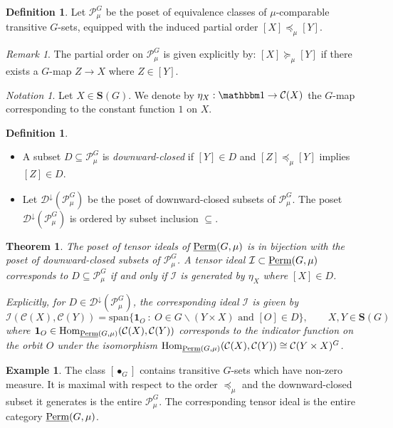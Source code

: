 \documentclass[11pt,a4paper]{amsart}
\theoremstyle{plain}%
\newtheorem{theorem}[lemma]{Theorem}
\theoremstyle{definition}
\newtheorem{definition}[lemma]{Definition}
\newtheorem{example}[lemma]{Example}
\theoremstyle{remark}
\newtheorem{remark}[lemma]{Remark}
\newtheorem{notation}[lemma]{Notation}
\newcommand{\Hom}{\operatorname{Hom}}
\newcommand{\triv}{{\mathbbm 1}}
\newcommand{\Span}{\mathrm{span}}
\newcommand{\Perm}{\underline{{\rm Perm}}}
\newcommand{\one}{{\mathbf{1}}}
\newcommand{\Down}{\mathcal{D}^{\downarrow}}
\newcommand{\cC}{\mathcal{C}}
\newcommand{\Set}[1]{\mathbf{S}(#1)}
\begin{document}
\begin{definition}
Let $\mathcal{P}^G_\mu$ be the poset of equivalence classes of $\mu$-comparable transitive $G$-sets, equipped with the induced partial order $[X] \preceq_\mu [Y]$. 

\end{definition}
\begin{remark}
    The partial order on $\mathcal{P}^G_\mu$ is given explicitly by: $[X] \succeq_\mu [Y]$ if there exists a $G$-map $Z\rightarrow X$ where $Z\in [Y]$.
\end{remark}

\begin{notation}
    Let $X\in \mathbf{S}(G)$. We denote by $\eta_X:\triv \to \mathcal{C}(X)$ the $G$-map corresponding to the constant function $1$ on $X$. 
\end{notation}




\begin{definition} 

\mbox{}

\begin{itemize}[itemindent=0pt,leftmargin=*]
    \item A subset $D \subseteq \mathcal{P}^G_\mu$ is \emph{downward-closed} if $[Y] \in D$ and $[Z] \preceq_\mu [Y]$ implies $[Z] \in D$. 
    \item Let $\Down(\mathcal{P}^G_\mu)$ be the poset of downward-closed subsets of $\mathcal{P}^G_{\mu}$. The poset $\Down(\mathcal{P}^G_\mu)$ is ordered by subset inclusion $\subseteq$.
\end{itemize}
\end{definition}


\begin{theorem}\label{thm:classification}
    The poset of tensor ideals of $\Perm(G, \mu)$ is in bijection with the poset of downward-closed subsets of $\mathcal{P}^G_\mu$. A tensor ideal $\mathcal{I}\subset\Perm(G, \mu)$ corresponds to $D\subseteq \mathcal{P}^G_\mu$ if {and} only if $\mathcal{I}$ is generated by $\eta_X$ where $[X]\in D$.

    Explicitly, for $D\in \Down(\mathcal{P}^G_\mu)$, the corresponding ideal $\mathcal{I} $ is given by $$\mathcal{I}(\cC(X), \cC(Y))=\Span\{\one_O~:~ O\in G\backslash (Y\times X) \text{ and }[O]\in D\}, \qquad X, Y\in \Set{G}$$
    where $\one_O\in \Hom_{\Perm(G, \mu)}(\cC(X), \cC(Y))$ corresponds to the indicator function on the orbit $O$ under the isomorphism $\Hom_{\Perm(G, \mu)}(\cC(X), \cC(Y))\cong \cC(Y\times X)^G$.
\end{theorem}
\begin{example}\label{ex:largest-class}
    The class $[\bullet_G]$ contains transitive $G$-sets which have non-zero measure. It is maximal with respect to the order $\preceq_\mu$ and the downward-closed subset it generates is the entire $\mathcal{P}^G_\mu$. The corresponding tensor ideal is the entire category $\Perm(G, \mu)$.
\end{example}
\end{document}
